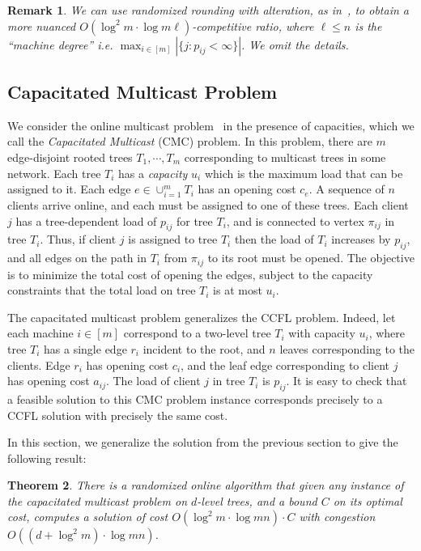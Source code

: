 \documentclass[letterpaper,11pt]{article}
\newtheorem{thm}{Theorem}[section]
\newtheorem{rem}[thm]{Remark}
\begin{document}
\begin{rem}
  We can use randomized rounding with alteration, as in~\cite{GN12-mor},
  to obtain a more nuanced $O(\log^2 m\cdot \log m\ell)$-competitive
  ratio, where $\ell\le n$ is the ``machine degree'' i.e. $\max_{i\in
    [m]} |\{j : p_{ij}<\infty\}|$. We omit the details.
\end{rem}


\subsection{Capacitated Multicast Problem}
\label{sec:multicast}

We consider the online multicast problem~\cite{AAABN-talg06} in the
presence of capacities, which we call the \emph{Capacitated Multicast}
(CMC) problem. In this problem, there are $m$ edge-disjoint rooted trees
$T_1,\cdots,T_m$ corresponding to multicast trees in some network. Each
tree $T_i$ has a {\em capacity} $u_i$ which is the maximum load that can
be assigned to it. Each edge $e\in \cup_{i=1}^m T_i$ has an opening cost
$c_e$. A sequence of $n$ clients arrive online, and each must be
assigned to one of these trees. Each client $j$ has a tree-dependent
load of $p_{ij}$ for tree $T_i$, and is connected to vertex $\pi_{ij}$
in tree $T_i$. Thus, if client $j$ is assigned to tree $T_i$ then the
load of $T_i$ increases by $p_{ij}$, and all edges on the path in $T_i$
from $\pi_{ij}$ to its root must be opened. The objective is to minimize
the total cost of opening the edges, subject to the capacity constraints
that the total load on tree $T_i$ is at most $u_i$.

The capacitated multicast problem generalizes the CCFL problem. Indeed,
let each machine $i\in [m]$ correspond to a two-level tree $T_i$ with
capacity $u_i$, where tree $T_i$ has a single edge $r_i$ incident to the
root, and $n$ leaves corresponding to the clients. Edge $r_i$ has
opening cost $c_i$, and the leaf edge corresponding to client $j$ has
opening cost $a_{ij}$. The load of client $j$ in tree $T_i$ is $p_{ij}$.
It is easy to check that a feasible solution to this CMC problem
instance corresponds precisely to a CCFL solution with precisely the
same cost.

In this section, we generalize the solution from the previous section to
give the following result:

\begin{thm}
  \label{thm:cmp}
  There is a randomized online algorithm that given any instance of the
  capacitated multicast problem on $d$-level trees, and a bound $C$ on
  its optimal cost, computes a solution of cost $O(\log^2m \cdot \log
  mn)\cdot C$ with congestion $O((d+\log^2m) \cdot \log mn)$.
\end{thm}
\end{document}
